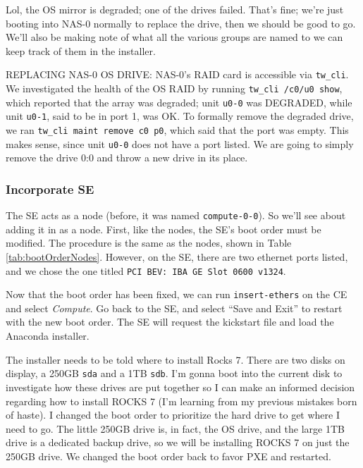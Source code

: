 \documentclass[12pt]{article}
\begin{document}
\qq Lol, the OS mirror is degraded; one of the drives failed. That's fine; we're
just booting into NAS-0 normally to replace the drive, then we should be good to
go. We'll also be making note of what all the various groups are named to we can
keep track of them in the installer.

\qq REPLACING NAS-0 OS DRIVE: NAS-0's RAID card is accessible via {\tt tw\_cli}.
We investigated the health of the OS RAID by running {\tt tw\_cli /c0/u0 show},
which reported that the array was degraded; unit {\tt u0-0} was DEGRADED, while
unit {\tt u0-1}, said to be in port 1, was OK. To formally remove the degraded
drive, we ran {\tt tw\_cli maint remove c0 p0}, which said that the port was
empty. This makes sense, since unit {\tt u0-0} does not have a port listed. We
are going to simply remove the drive 0:0 and throw a new drive in its place.

\subsubsection{Incorporate SE}

\qq The SE acts as a node (before, it was named {\tt compute-0-0}). So we'll see
about adding it in as a node. First, like the nodes, the SE's boot order must be
modified. The procedure is the same as the nodes, shown in Table
\ref{tab:bootOrderNodes}. However, on the SE, there are two ethernet ports
listed, and we chose the one titled {\tt PCI BEV: IBA GE Slot 0600 v1324}.

\qq Now that the boot order has been fixed, we can run {\tt insert-ethers} on the
CE and select \textit{Compute}. Go back to the SE, and select ``Save and Exit''
to restart with the new boot order. The SE will request the kickstart
file and load the Anaconda installer.

\begin{tcolorbox}[title=ASIDE, colback=white, colframe=blue]
  The installer needs to be told where to install Rocks 7. There are two disks
  on display, a 250GB {\tt sda} and a 1TB {\tt sdb}. I'm gonna boot into the
  current disk to investigate how these drives are put together so I can make an
  informed decision regarding how to install ROCKS 7 (I'm learning from my
  previous mistakes born of haste). I changed the boot order to prioritize the
  hard drive to get where I need to go. The little 250GB drive is, in fact, the OS
  drive, and the large 1TB drive is a dedicated backup drive, so we will be
  installing ROCKS 7 on just the 250GB drive. We changed the boot order back to
  favor PXE and restarted.
\end{tcolorbox}
\end{document}

